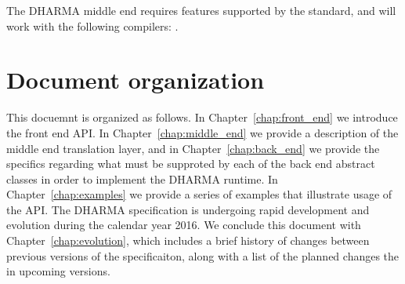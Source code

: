 The DHARMA \gls{middle end} requires \CC features supported by the 
standard, and will work with the following compilers: .









\section{Document organization}
\label{sec:organization}
This docuemnt is organized as follows.  In Chapter~\ref{chap:front_end} we
introduce the \gls{front end} \gls{API}.  In Chapter~\ref{chap:middle_end} we
provide a description of the \gls{middle end} translation layer, and in
Chapter~\ref{chap:back_end} we provide the specifics regarding what must be
supproted by each of the \gls{back end} abstract classes in order to implement
the DHARMA runtime. In Chapter~\ref{chap:examples} we provide a series of
examples that illustrate usage of the \gls{API}. The DHARMA specification is
undergoing rapid development and evolution during the calendar year 2016.  
We conclude this document with
Chapter~\ref{chap:evolution}, which includes a brief history of changes between
previous versions of the specificaiton, along with a list of the planned changes the
in upcoming versions.


